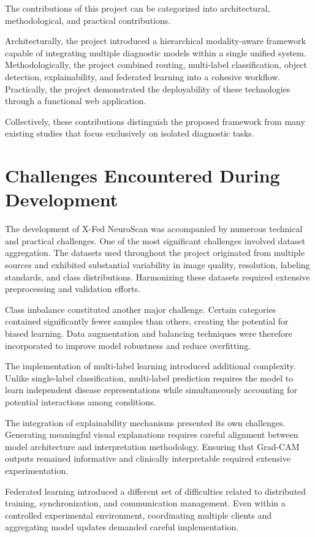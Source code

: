 The contributions of this project can be categorized into architectural, methodological, and practical contributions.

Architecturally, the project introduced a hierarchical modality-aware framework capable of integrating multiple diagnostic models within a single unified system. Methodologically, the project combined routing, multi-label classification, object detection, explainability, and federated learning into a cohesive workflow. Practically, the project demonstrated the deployability of these technologies through a functional web application.

Collectively, these contributions distinguish the proposed framework from many existing studies that focus exclusively on isolated diagnostic tasks.

\section{Challenges Encountered During Development}

The development of X-Fed NeuroScan was accompanied by numerous technical and practical challenges. One of the most significant challenges involved dataset aggregation. The datasets used throughout the project originated from multiple sources and exhibited substantial variability in image quality, resolution, labeling standards, and class distributions. Harmonizing these datasets required extensive preprocessing and validation efforts.

Class imbalance constituted another major challenge. Certain categories contained significantly fewer samples than others, creating the potential for biased learning. Data augmentation and balancing techniques were therefore incorporated to improve model robustness and reduce overfitting.

The implementation of multi-label learning introduced additional complexity. Unlike single-label classification, multi-label prediction requires the model to learn independent disease representations while simultaneously accounting for potential interactions among conditions.

The integration of explainability mechanisms presented its own challenges. Generating meaningful visual explanations requires careful alignment between model architecture and interpretation methodology. Ensuring that Grad-CAM outputs remained informative and clinically interpretable required extensive experimentation.

Federated learning introduced a different set of difficulties related to distributed training, synchronization, and communication management. Even within a controlled experimental environment, coordinating multiple clients and aggregating model updates demanded careful implementation.

